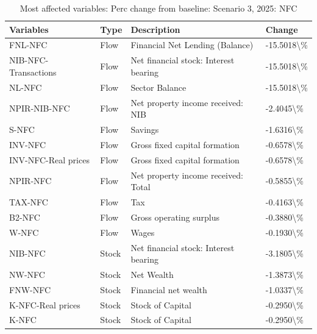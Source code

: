\documentclass[
]{book}
\begin{document}
\begin{table}

\caption{\label{tab:most-affected-Scenario-3-perc-NFC-2025}Most affected variables: Perc change from baseline: Scenario 3, 2025: NFC}
\centering
\fontsize{10}{12}\selectfont
\begin{tabular}[t]{l|l|l|l}
\hline
Variables & Type & Description & Change\\
\hline
FNL-NFC & Flow & Financial Net Lending (Balance) & -15.5018\textbackslash{}\%\\
\hline
NIB-NFC-Transactions & Flow & Net financial stock: Interest bearing & -15.5018\textbackslash{}\%\\
\hline
NL-NFC & Flow & Sector Balance & -15.5018\textbackslash{}\%\\
\hline
NPIR-NIB-NFC & Flow & Net property income received: NIB & -2.4045\textbackslash{}\%\\
\hline
S-NFC & Flow & Savings & -1.6316\textbackslash{}\%\\
\hline
INV-NFC & Flow & Gross fixed capital formation & -0.6578\textbackslash{}\%\\
\hline
INV-NFC-Real prices & Flow & Gross fixed capital formation & -0.6578\textbackslash{}\%\\
\hline
NPIR-NFC & Flow & Net property income received: Total & -0.5855\textbackslash{}\%\\
\hline
TAX-NFC & Flow & Tax & -0.4163\textbackslash{}\%\\
\hline
B2-NFC & Flow & Gross operating surplus & -0.3880\textbackslash{}\%\\
\hline
W-NFC & Flow & Wages & -0.1930\textbackslash{}\%\\
\hline
NIB-NFC & Stock & Net financial stock: Interest bearing & -3.1805\textbackslash{}\%\\
\hline
NW-NFC & Stock & Net Wealth & -1.3873\textbackslash{}\%\\
\hline
FNW-NFC & Stock & Financial net wealth & -1.0337\textbackslash{}\%\\
\hline
K-NFC-Real prices & Stock & Stock of Capital & -0.2950\textbackslash{}\%\\
\hline
K-NFC & Stock & Stock of Capital & -0.2950\textbackslash{}\%\\
\hline
\end{tabular}
\end{table}
\end{document}
